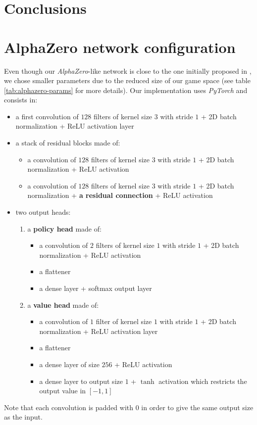 \documentclass[journal, a4paper]{IEEEtran}
\begin{document}
\section{Conclusions}
\label{sec:conclusion}




\newpage
\section*{AlphaZero network configuration}
\label{sec:alphazero-network}
Even though our \textit{AlphaZero}-like network is close to the one initially proposed in \cite{alphagozero}, we chose smaller parameters due to the reduced size of our game space (see table \ref{tab:alphazero-params} for more details). Our implementation uses \textit{PyTorch}\cite{pytorch} and consists in:
\begin{itemize}
    \item a first convolution of $128$ filters of kernel size $3$ with stride $1$ + 2D batch normalization + ReLU activation layer
    \item a stack of residual blocks made of:
    \begin{itemize}
        \item a convolution of $128$ filters of kernel size $3$ with stride $1$ + 2D batch normalization + ReLU activation
        \item a convolution of $128$ filters of kernel size $3$ with stride $1$ + 2D batch normalization + \textbf{a residual connection} + ReLU activation
    \end{itemize}
    \item two output heads:
    \begin{enumerate}
        \item a \textbf{policy head} made of:
            \begin{itemize}
                \item a convolution of $2$ filters of kernel size $1$ with stride $1$ + 2D batch normalization + ReLU activation
                \item a flattener
                \item a dense layer + softmax output layer
            \end{itemize}
        \item a \textbf{value head} made of:
            \begin{itemize}
                \item a convolution of $1$ filter of kernel size $1$ with stride $1$ + 2D batch normalization + ReLU activation layer
                \item a flattener
                \item a dense layer of size $256$ + ReLU activation
                \item a dense layer to output size $1$ + $\tanh$ activation which restricts the output value in $[-1,1]$
            \end{itemize}
    \end{enumerate}
\end{itemize}
Note that each convolution is padded with 0 in order to give the same output size as the input.
\end{document}

